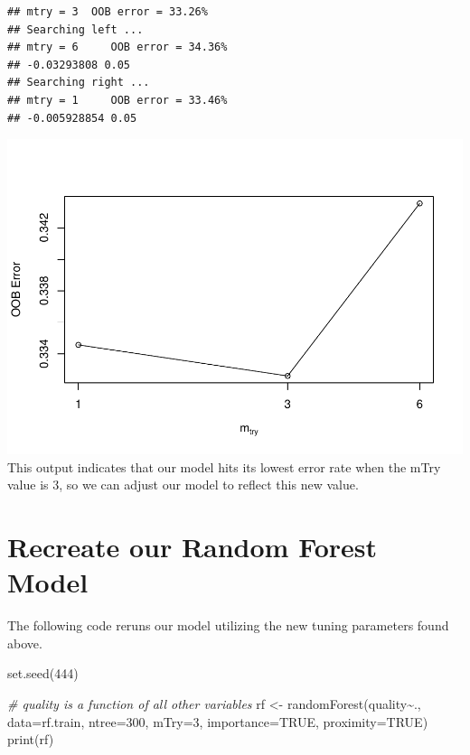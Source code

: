 \documentclass[
]{book}
\newenvironment{Shaded}{\begin{snugshade}}{\end{snugshade}}
\newcommand{\AttributeTok}[1]{\textcolor[rgb]{0.77,0.63,0.00}{#1}}
\newcommand{\CommentTok}[1]{\textcolor[rgb]{0.56,0.35,0.01}{\textit{#1}}}
\newcommand{\ConstantTok}[1]{\textcolor[rgb]{0.00,0.00,0.00}{#1}}
\newcommand{\DecValTok}[1]{\textcolor[rgb]{0.00,0.00,0.81}{#1}}
\newcommand{\FunctionTok}[1]{\textcolor[rgb]{0.00,0.00,0.00}{#1}}
\newcommand{\NormalTok}[1]{#1}
\newcommand{\OtherTok}[1]{\textcolor[rgb]{0.56,0.35,0.01}{#1}}
\newcommand{\SpecialCharTok}[1]{\textcolor[rgb]{0.00,0.00,0.00}{#1}}
\begin{document}
\begin{verbatim}
## mtry = 3  OOB error = 33.26% 
## Searching left ...
## mtry = 6     OOB error = 34.36% 
## -0.03293808 0.05 
## Searching right ...
## mtry = 1     OOB error = 33.46% 
## -0.005928854 0.05
\end{verbatim}

\includegraphics{FinalProject-Bright-Santoro_files/figure-latex/unnamed-chunk-19-1.pdf}
This output indicates that our model hits its lowest error rate when the mTry value is 3, so we can adjust our model to reflect this new value.

\hypertarget{recreate-our-random-forest-model}{%
\section{Recreate our Random Forest Model}\label{recreate-our-random-forest-model}}

The following code reruns our model utilizing the new tuning parameters found above.

\begin{Shaded}
\begin{Highlighting}[]
\FunctionTok{set.seed}\NormalTok{(}\DecValTok{444}\NormalTok{)}

\CommentTok{\# quality is a function of all other variables }
\NormalTok{rf }\OtherTok{\textless{}{-}} \FunctionTok{randomForest}\NormalTok{(quality}\SpecialCharTok{\textasciitilde{}}\NormalTok{., }\AttributeTok{data=}\NormalTok{rf.train,}
                   \AttributeTok{ntree=}\DecValTok{300}\NormalTok{,}
                   \AttributeTok{mTry=}\DecValTok{3}\NormalTok{, }
                   \AttributeTok{importance=}\ConstantTok{TRUE}\NormalTok{,}
                   \AttributeTok{proximity=}\ConstantTok{TRUE}\NormalTok{)}
\FunctionTok{print}\NormalTok{(rf)}
\end{Highlighting}
\end{Shaded}
\end{document}

